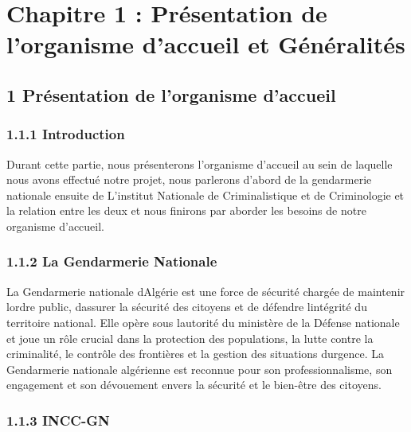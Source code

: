 \documentclass[
]{article}
\begin{document}
\section{Chapitre 1 : Présentation de l'organisme d'accueil et
Généralités}\label{chapitre-1-pruxe9sentation-de-lorganisme-daccueil-et-guxe9nuxe9ralituxe9s}

\subsection{1 Présentation de l'organisme
d'accueil}\label{pruxe9sentation-de-lorganisme-daccueil}

\subsubsection{1.1.1 Introduction}\label{introduction}

Durant cette partie, nous présenterons l'organisme d'accueil au sein de
laquelle nous avons effectué notre projet, nous parlerons d'abord de la
gendarmerie nationale ensuite de L'institut Nationale de Criminalistique
et de Criminologie et la relation entre les deux et nous finirons par
aborder les besoins de notre organisme d'accueil.

\subsubsection{1.1.2 La Gendarmerie
Nationale}\label{la-gendarmerie-nationale}

La Gendarmerie nationale d\textquotesingle Algérie est une force de
sécurité chargée de maintenir l\textquotesingle ordre public,
d\textquotesingle assurer la sécurité des citoyens et de défendre
l\textquotesingle intégrité du territoire national. Elle opère sous
l\textquotesingle autorité du ministère de la Défense nationale et joue
un rôle crucial dans la protection des populations, la lutte contre la
criminalité, le contrôle des frontières et la gestion des situations
d\textquotesingle urgence. La Gendarmerie nationale algérienne est
reconnue pour son professionnalisme, son engagement et son dévouement
envers la sécurité et le bien-être des citoyens.

\subsubsection{1.1.3 INCC-GN}\label{incc-gn}
\end{document}
